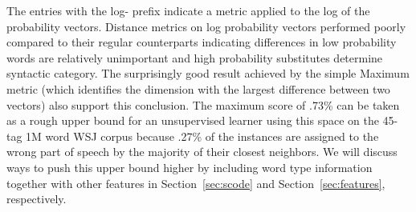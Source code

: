 The entries with the log- prefix indicate a metric applied to the log
of the probability vectors.  Distance metrics on log probability
vectors performed poorly compared to their regular counterparts
indicating differences in low probability words are relatively
unimportant and high probability substitutes determine syntactic
category.  The surprisingly good result achieved by the simple Maximum
metric (which identifies the dimension with the largest difference
between two vectors) also support this conclusion.  The maximum score
of .73\% can be taken as a rough upper bound for an unsupervised
learner using this space on the 45-tag 1M word WSJ corpus because
.27\% of the instances are assigned to the wrong part of speech by the
majority of their closest neighbors.  We will discuss ways to push
this upper bound higher by including word type information together
with other features in Section~\ref{sec:scode} and
Section~\ref{sec:features}, respectively.


